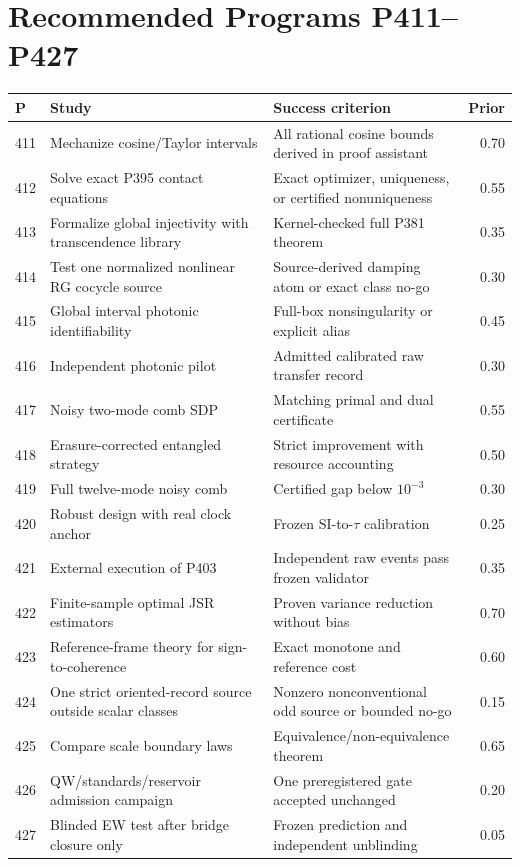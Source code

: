 \documentclass[11pt,a4paper,openany]{report}
\begin{document}
\chapter{Recommended Programs P411--P427}

\small
\begin{longtable}{@{}p{}p{}p{}r@{}}
\toprule
\textbf{P} & \textbf{Study} & \textbf{Success criterion} & \textbf{Prior}\\
\midrule
\endhead
411 & Mechanize cosine/Taylor intervals & All rational cosine bounds derived in proof assistant & 0.70\\
412 & Solve exact P395 contact equations & Exact optimizer, uniqueness, or certified nonuniqueness & 0.55\\
413 & Formalize global injectivity with transcendence library & Kernel-checked full P381 theorem & 0.35\\
414 & Test one normalized nonlinear RG cocycle source & Source-derived damping atom or exact class no-go & 0.30\\
415 & Global interval photonic identifiability & Full-box nonsingularity or explicit alias & 0.45\\
416 & Independent photonic pilot & Admitted calibrated raw transfer record & 0.30\\
417 & Noisy two-mode comb SDP & Matching primal and dual certificate & 0.55\\
418 & Erasure-corrected entangled strategy & Strict improvement with resource accounting & 0.50\\
419 & Full twelve-mode noisy comb & Certified gap below $10^{-3}$ & 0.30\\
420 & Robust design with real clock anchor & Frozen SI-to-$\tau$ calibration & 0.25\\
421 & External execution of P403 & Independent raw events pass frozen validator & 0.35\\
422 & Finite-sample optimal JSR estimators & Proven variance reduction without bias & 0.70\\
423 & Reference-frame theory for sign-to-coherence & Exact monotone and reference cost & 0.60\\
424 & One strict oriented-record source outside scalar classes & Nonzero nonconventional odd source or bounded no-go & 0.15\\
425 & Compare scale boundary laws & Equivalence/non-equivalence theorem & 0.65\\
426 & QW/standards/reservoir admission campaign & One preregistered gate accepted unchanged & 0.20\\
427 & Blinded EW test after bridge closure only & Frozen prediction and independent unblinding & 0.05\\
\bottomrule
\end{longtable}
\normalsize
\end{document}
